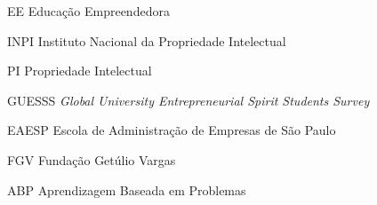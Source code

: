 
\begin{siglas}
    
  	\item[EE]{Educação Empreendedora}
  	\item[INPI]{Instituto Nacional da Propriedade Intelectual}
  	\item[PI]{Propriedade Intelectual}
  	\item[GUESSS]{\textit{Global University Entrepreneurial Spirit Students Survey}}
  	\item[EAESP]{Escola de Administração de Empresas de São Paulo}
  	\item[FGV]{Fundação Getúlio Vargas}
  	\item[ABP]{ Aprendizagem Baseada em Problemas}

\end{siglas}
